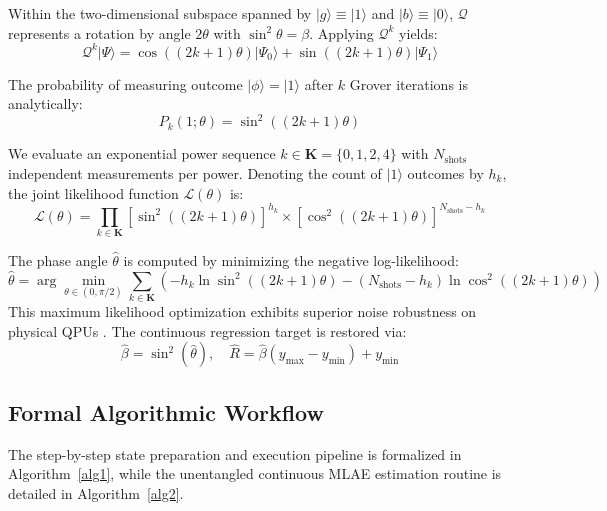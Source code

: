 \documentclass[sn-mathphys,Numbered]{sn-jnl}
\theoremstyle{thmstyleone}
\theoremstyle{thmstyletwo}
\theoremstyle{thmstylethree}
\begin{document}
Within the two-dimensional subspace spanned by $|g\rangle \equiv |1\rangle$ and $|b\rangle \equiv |0\rangle$, $\mathcal{Q}$ represents a rotation by angle $2\theta$ with $\sin^2\theta = \beta$. Applying $\mathcal{Q}^k$ yields:
\begin{equation}\label{eq11}
\mathcal{Q}^k |\Psi\rangle = \cos((2k + 1)\theta)|\Psi_0\rangle + \sin((2k + 1)\theta)|\Psi_1\rangle
\end{equation}

The probability of measuring outcome $|\phi\rangle = |1\rangle$ after $k$ Grover iterations is analytically:
\begin{equation}\label{eq12}
P_k(1; \theta) = \sin^2((2k + 1)\theta)
\end{equation}

We evaluate an exponential power sequence $k \in \mathbf{K} = \{0, 1, 2, 4\}$ with $N_{\text{shots}}$ independent measurements per power. Denoting the count of $|1\rangle$ outcomes by $h_k$, the joint likelihood function $\mathcal{L}(\theta)$ is:
\begin{equation}\label{eq13}
\mathcal{L}(\theta) = \prod_{k \in \mathbf{K}} \left[\sin^2((2k + 1)\theta)\right]^{h_k} \times \left[\cos^2((2k + 1)\theta)\right]^{N_{\text{shots}} - h_k}
\end{equation}

The phase angle $\hat{\theta}$ is computed by minimizing the negative log-likelihood:
\begin{equation}\label{eq14}
\hat{\theta} = \arg\min_{\theta \in (0, \pi/2)} \sum_{k \in \mathbf{K}} \left( - h_k \ln \sin^2((2k + 1)\theta) - (N_{\text{shots}} - h_k) \ln \cos^2((2k + 1)\theta) \right)
\end{equation}
This maximum likelihood optimization exhibits superior noise robustness on physical QPUs \cite{tanaka2022amplitude}. The continuous regression target is restored via:
\begin{equation}\label{eq15}
\hat{\beta} = \sin^2(\hat{\theta}), \quad \hat{R} = \hat{\beta}(y_{\max} - y_{\min}) + y_{\min}
\end{equation}

\subsection{Formal Algorithmic Workflow}\label{subsec4.4}

The step-by-step state preparation and execution pipeline is formalized in Algorithm~\ref{alg1}, while the unentangled continuous MLAE estimation routine is detailed in Algorithm~\ref{alg2}.
\end{document}
